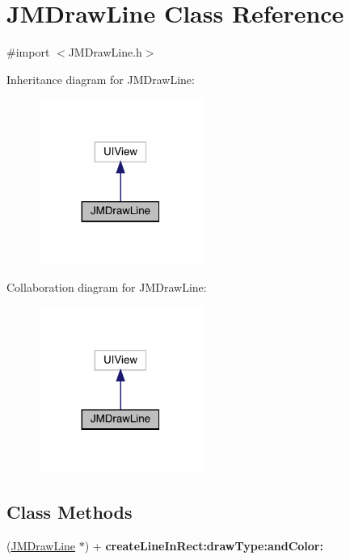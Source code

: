 \hypertarget{interface_j_m_draw_line}{}\section{J\+M\+Draw\+Line Class Reference}
\label{interface_j_m_draw_line}


{\ttfamily \#import $<$J\+M\+Draw\+Line.\+h$>$}



Inheritance diagram for J\+M\+Draw\+Line\+:\nopagebreak
\begin{figure}[H]
\begin{center}
\leavevmode
\includegraphics[width=152pt]{interface_j_m_draw_line__inherit__graph}
\end{center}
\end{figure}


Collaboration diagram for J\+M\+Draw\+Line\+:\nopagebreak
\begin{figure}[H]
\begin{center}
\leavevmode
\includegraphics[width=152pt]{interface_j_m_draw_line__coll__graph}
\end{center}
\end{figure}
\subsection*{Class Methods}
\begin{DoxyCompactItemize}
\item 
\mbox{\label{interface_j_m_draw_line_a57bc48eedef10540c1a35a9d66fb4edb}} 
(\mbox{\hyperlink{interface_j_m_draw_line}{J\+M\+Draw\+Line}} $\ast$) + {\bfseries create\+Line\+In\+Rect\+:draw\+Type\+:and\+Color\+:}
\end{DoxyCompactItemize}


